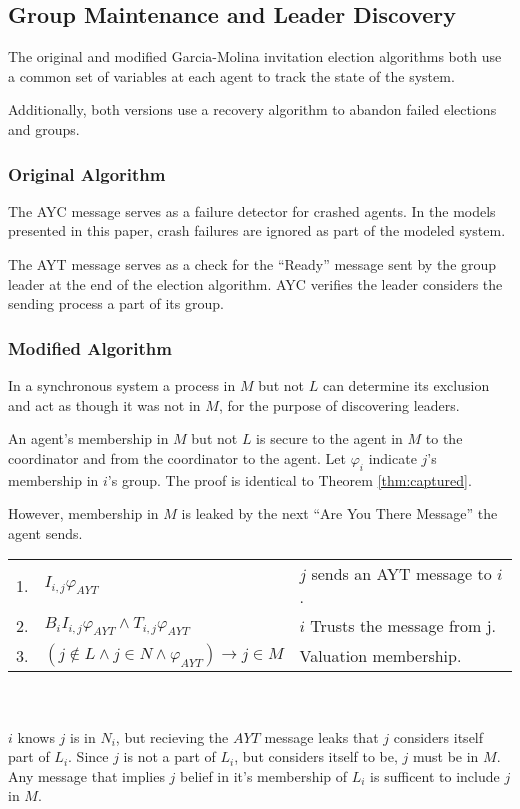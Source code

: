 \subsection{Group Maintenance and Leader Discovery}

The original and modified Garcia-Molina invitation election algorithms both use a common set of variables at each agent to track the state of the system.

Additionally, both versions use a recovery algorithm to abandon failed elections and groups.

\subsubsection{Original Algorithm}

The \ac{AYC} message serves as a failure detector for crashed agents. In the models presented in this paper, crash failures are ignored as part of the modeled system.

The \ac{AYT} message serves as a check for the ``Ready'' message sent by the group leader at the end of the election algorithm. \ac{AYC} verifies the leader considers the sending process a part of its group.

\subsubsection{Modified Algorithm}

\begin{thm}
In a synchronous system a process in $M$ but not $L$ can determine its exclusion and act as though it was not in $M$, for the purpose of discovering leaders.
\end{thm}

An agent's membership in $M$ but not $L$ is secure to the agent in $M$ to the coordinator and from the coordinator to the agent. Let $\varphi_i$ indicate $j$'s membership in $i$'s group. The proof is identical to Theorem \ref{thm:captured}.

However, membership in $M$ is leaked by the next ``Are You There Message'' the agent sends.

\begin{table}[h!]
\centering
\small
\begin{tabularx}{\linewidth}{l X X}
1. & $I_{i,j} \varphi_{AYT}$ & $j$ sends an AYT message to $i$. \\
2. & $B_i I_{i,j} \varphi_{AYT} \wedge T_{i,j} \varphi_{AYT}$ & $i$ Trusts the message from j. \\
3. & $(j \not \in L \wedge j \in N \wedge \varphi_{AYT}) \rightarrow j \in M $ & Valuation membership. \\ 
\end{tabularx} \\~\\
$i$ knows $j$ is in $N_i$, but recieving the $AYT$ message leaks that $j$ considers itself part of $L_i$. Since $j$ is not a part of $L_i$, but considers itself to be, $j$ must be in $M$. Any message that implies $j$ belief in it's membership of $L_i$ is sufficent to include $j$ in $M$.
\end{table}

